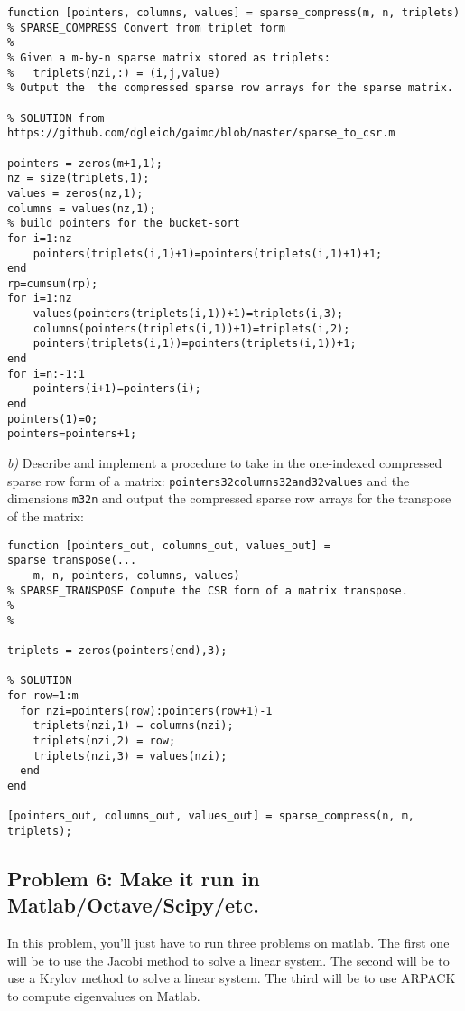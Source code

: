 \documentclass{article}
\begin{document}
\begin{verbatim}function [pointers, columns, values] = sparse_compress(m, n, triplets)
% SPARSE_COMPRESS Convert from triplet form
%
% Given a m-by-n sparse matrix stored as triplets:
%   triplets(nzi,:) = (i,j,value)
% Output the  the compressed sparse row arrays for the sparse matrix.

% SOLUTION from https://github.com/dgleich/gaimc/blob/master/sparse_to_csr.m

pointers = zeros(m+1,1);
nz = size(triplets,1);
values = zeros(nz,1);
columns = values(nz,1);
% build pointers for the bucket-sort
for i=1:nz
    pointers(triplets(i,1)+1)=pointers(triplets(i,1)+1)+1;
end
rp=cumsum(rp);
for i=1:nz
    values(pointers(triplets(i,1))+1)=triplets(i,3); 
    columns(pointers(triplets(i,1))+1)=triplets(i,2);
    pointers(triplets(i,1))=pointers(triplets(i,1))+1;
end
for i=n:-1:1
    pointers(i+1)=pointers(i);
end
pointers(1)=0;
pointers=pointers+1;

\end{verbatim}
\emph{b)} Describe and implement a procedure to take in the one-indexed compressed sparse row form of a matrix: {\colorbox[rgb]{1.00,0.93,1.00}{\tt pointers\char32columns\char32and\char32values}} and the dimensions {\colorbox[rgb]{1.00,0.93,1.00}{\tt m\char32n}} and output the compressed sparse row arrays for the transpose of the matrix:

\begin{verbatim}function [pointers_out, columns_out, values_out] = sparse_transpose(...
	m, n, pointers, columns, values)
% SPARSE_TRANSPOSE Compute the CSR form of a matrix transpose.
%
% 

triplets = zeros(pointers(end),3);

% SOLUTION
for row=1:m
  for nzi=pointers(row):pointers(row+1)-1
    triplets(nzi,1) = columns(nzi);
    triplets(nzi,2) = row;
    triplets(nzi,3) = values(nzi);
  end
end

[pointers_out, columns_out, values_out] = sparse_compress(n, m, triplets);
\end{verbatim}
\hypertarget{problem_6_make_it_run_in_matlaboctavescipyetc_8}{}\subsection*{{Problem 6: Make it run in Matlab/Octave/Scipy/etc.}}\label{problem_6_make_it_run_in_matlaboctavescipyetc_8}

In this problem, you'{}ll just have to run three problems on matlab. The first one will be to use the Jacobi method to solve a linear system. The second will be to use a Krylov method to solve a linear system. The third will be to use ARPACK to compute eigenvalues on Matlab.
\end{document}
